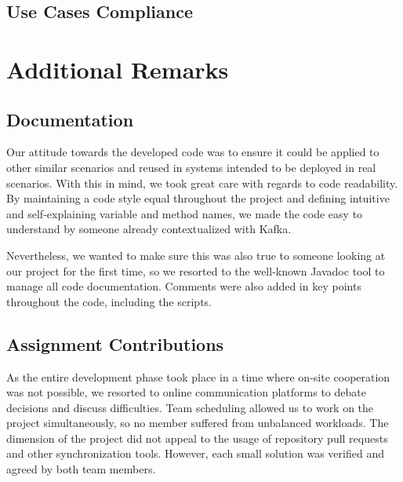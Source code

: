 \documentclass[12pt]{article}
\begin{document}
\subsection{Use Cases Compliance} \label{compliance} %


\newpage
\section{Additional Remarks} \label{remarks} %

\subsection{Documentation} \label{documentation} %

Our attitude towards the developed code was to ensure it could be applied to other similar scenarios and reused in systems intended to be deployed in real scenarios.
With this in mind, we took great care with regards to code readability.
By maintaining a code style equal throughout the project and defining intuitive and self-explaining variable and method names, we made the code easy to understand
by someone already contextualized with Kafka.

Nevertheless, we wanted to make sure this was also true to someone looking at our project for the first time, so we resorted to the well-known Javadoc
\cite{javadoc} tool to manage all code documentation.
Comments were also added in key points throughout the code, including the scripts.

\subsection{Assignment Contributions} \label{contributions} %

As the entire development phase took place in a time where on-site cooperation was not possible, we resorted to online communication platforms to debate decisions
and discuss difficulties.
Team scheduling allowed us to work on the project simultaneously, so no member suffered from unbalanced workloads.
The dimension of the project did not appeal to the usage of repository pull requests and other synchronization tools.
However, each small solution was verified and agreed by both team members.
\end{document}
